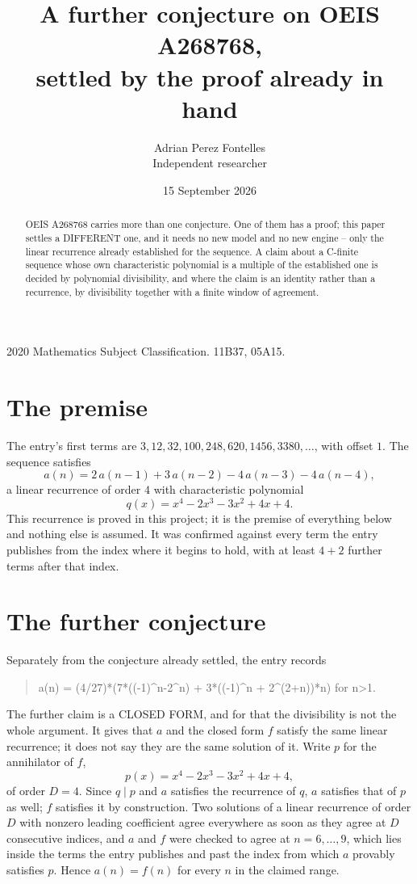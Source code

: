\documentclass[11pt,a4paper]{article}
\title{A further conjecture on OEIS A268768,\\ \large settled by the proof already in hand}
\author{Adrian Perez Fontelles\\ \small Independent researcher}
\date{15 September 2026}
\theoremstyle{plain}
\theoremstyle{definition}
\begin{document}
\maketitle

\begin{abstract}
OEIS A268768 carries more than one conjecture. One of them has a proof; this paper settles a
DIFFERENT one, and it needs no new model and no new engine -- only the linear recurrence already
established for the sequence. A claim about a C-finite sequence whose own characteristic
polynomial is a multiple of the established one is decided by polynomial divisibility, and where
the claim is an identity rather than a recurrence, by divisibility together with a finite window
of agreement.
\end{abstract}

\noindent\small 2020 Mathematics Subject Classification. 11B37, 05A15.\normalsize

\section{The premise}

The entry's first terms are $3, 12, 32, 100, 248, 620, 1456, 3380,\dots$, with offset $1$. The sequence satisfies
\[
  a(n)=2\,a(n-1) + 3\,a(n-2) - 4\,a(n-3) - 4\,a(n-4) ,
\]
a linear recurrence of order $4$ with characteristic polynomial
\[
  q(x)=x^{4} - 2 x^{3} - 3 x^{2} + 4 x + 4 .
\]
This recurrence is proved in this project; it is the premise of everything below and nothing else is assumed.
It was confirmed against every term the entry publishes from the index where it begins to hold,
with at least $4+2$ further terms after that index.

\section{The further conjecture}

Separately from the conjecture already settled, the entry records

\begin{quote}\raggedright a(n) = (4/27)*(7*((-1)\^{}n-2\^{}n) + 3*((-1)\^{}n + 2\^{}(2+n))*n) for n>1.\end{quote}

The further claim is a CLOSED FORM, and for that the divisibility is not the whole argument. It
gives that $a$ and the closed form $f$ satisfy the same linear recurrence; it does not say they
are the same solution of it. Write $p$ for the annihilator of $f$,
\[
  p(x)=x^{4} - 2 x^{3} - 3 x^{2} + 4 x + 4 ,
\]
of order $D=4$. Since $q\mid p$ and $a$ satisfies the recurrence of $q$, $a$ satisfies that of
$p$ as well; $f$ satisfies it by construction. Two solutions of a linear recurrence of order $D$
with nonzero leading coefficient agree everywhere as soon as they agree at $D$ consecutive
indices, and $a$ and $f$ were checked to agree at $n=6,\dots,9$,
which lies inside the terms the entry publishes and past the index from which $a$ provably
satisfies $p$. Hence $a(n)=f(n)$ for every $n$ in the claimed range.
\end{document}
